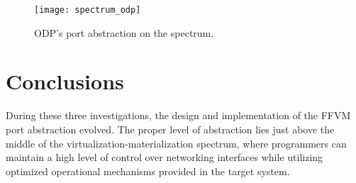\begin{figure}[h!]
  \centering
  \texttt{[image: spectrum\_odp]}
  \caption{ODP's port abstraction on the spectrum.}
  \label{hardware:spectrum_odp}
\end{figure}

\section{Conclusions}
\label{hardware:concl}
During these three investigations, the design and implementation of the FFVM
port abstraction evolved. The proper level of abstraction lies just above the
middle of the virtualization-materialization spectrum, where programmers can
maintain a high level of control over networking interfaces while utilizing
optimized operational mechanisms provided in the target system.


